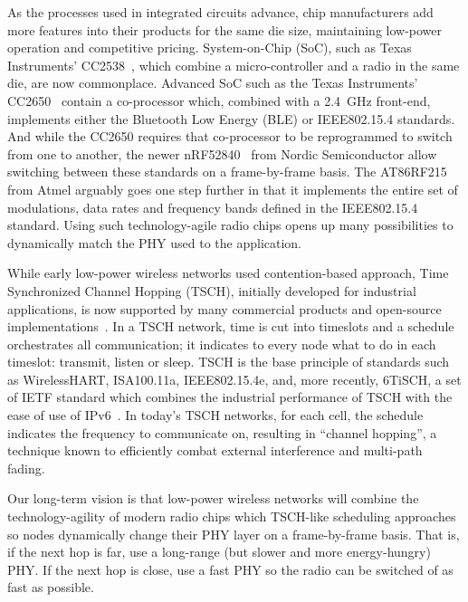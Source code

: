 \documentclass[sensors,article,submit,moreauthors,pdftex]{Definitions/mdpi}
\begin{document}
As the processes used in integrated circuits advance, chip manufacturers add more features into their products for the same die size,
    maintaining low-power operation and
    competitive pricing.
System-on-Chip (SoC), such as Texas Instruments' CC2538~\cite{datasheet_cc2538}, which combine a micro-controller and a radio in the same die, are now commonplace.
Advanced SoC such as the Texas Instruments' CC2650~\cite{datasheet_cc2650} contain a co-processor which, combined with a 2.4~GHz front-end, implements either the Bluetooth Low Energy (BLE) or IEEE802.15.4 standards.
And while the CC2650 requires that co-processor to be reprogrammed to switch from one to another,
    the newer nRF52840~\cite{datasheet_nrf52840} from Nordic Semiconductor allow switching between these standards on a frame-by-frame basis.
The AT86RF215 from Atmel arguably goes one step further in that it implements the entire set of modulations, data rates and frequency bands defined in the IEEE802.15.4 standard.
Using such technology-agile radio chips opens up many possibilities to dynamically match the PHY used to the application.


While early low-power wireless networks used contention-based approach,
    Time Synchronized Channel Hopping (TSCH), initially developed for industrial applications,
    is now supported by many commercial products and open-source implementations~\cite{watteyne16industrial}.
In a TSCH network, time is cut into timeslots and a schedule orchestrates all communication;
    it indicates to every node what to do in each timeslot: transmit, listen or sleep.
TSCH is the base principle of standards such as WirelessHART, ISA100.11a, IEEE802.15.4e, and, more recently, 6TiSCH, a set of IETF standard which combines the industrial performance of TSCH with the ease of use of IPv6~\cite{draft-ietf-6tisch-msf}.
In today's TSCH networks, for each cell, the schedule indicates the frequency to communicate on, resulting in ``channel hopping'', a technique known to efficiently combat external interference and multi-path fading.


Our long-term vision is that low-power wireless networks will combine the technology-agility of modern radio chips which TSCH-like scheduling approaches so nodes dynamically change their PHY layer on a frame-by-frame basis.
That is, if the next hop is far,   use a long-range (but slower and more energy-hungry) PHY.
         If the next hop is close, use a fast PHY so the radio can be switched of as fast as possible.
\end{document}
